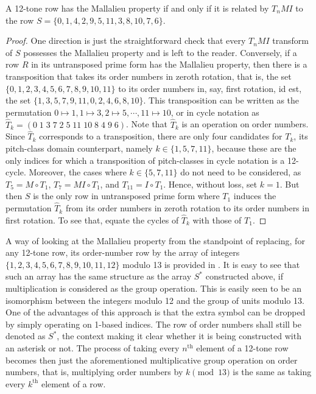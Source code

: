 \begin{proposition}
	\cite[17]{Morris1976}
	\label{morris-mallalieu}
	A 12-tone row has the Mallalieu property if and only if it is related by $T_nMI$ to the row $S = \{ 0, 1, 4, 2, 9, 5, 11, 3, 8, 10, 7, 6 \}$.
	\begin{proof}
		One direction is just the straightforward check that every $T_nMI$ transform of $S$ possesses the Mallalieu property and is left to the reader. Conversely, if a row $R$ in its untransposed prime form has the Mallalieu property, then there is a transposition that takes its order numbers in zeroth rotation, that is, the set $\{ 0, 1, 2, 3, 4, 5, 6, 7, 8, 9, 10, 11 \}$ to its order numbers in, say, first rotation, id est, the set $\{ 1, 3, 5, 7, 9, 11, 0, 2, 4, 6, 8, 10 \}$. This transposition can be written as the permutation $0 \mapsto 1, 1 \mapsto 3, 2 \mapsto 5, \cdots, 11 \mapsto 10 $, or in cycle notation as $\hat{T}_k = ( 0 \; 1 \; 3 \; 7 \; 2 \; 5 \; 11 \; 10 \; 8 \; 4 \; 9 \; 6 )$. Note that $\hat{T}_k$ is an operation on order numbers. Since $\hat{T}_k$ corresponds to a transposition, there are only four candidates for $T_k$, its pitch-class domain counterpart, namely $k \in \{ 1, 5, 7, 11 \}$, because these are the only indices for which a transposition of pitch-classes in cycle notation is a 12-cycle. Moreover, the cases where $k \in \{5, 7, 11\}$ do not need to be considered, as $T_5 = M \circ T_1$, $T_7 = M I \circ T_1$, and $T_{11} = I \circ T_1$. Hence, without loss, set $k = 1$. But then $S$ is the only row in untransposed prime form where $T_1$ induces the permutation $\hat{T}_k$ from its order numbers in zeroth rotation to its order numbers in first rotation. To see that, equate the cycles of $\hat{T}_k$ with those of $T_1$.
	\end{proof}
\end{proposition}

A way of looking at the Mallalieu property from the standpoint of replacing, for any 12-tone row, its order-number row by the array of integers $\{ 1, 2, 3, 4, 5, 6, 7, 8, 9, 10, 11, 12 \}$ modulo 13 is provided in \cite[278]{Lewin1966}. It is easy to see that such an array has the same structure as the array $S^*$ constructed above, if multiplication is considered as the group operation. This is easily seen to be an isomorphism between the integers modulo 12 and the group of units modulo 13. One of the advantages of this approach is that the extra symbol can be dropped by simply operating on 1-based indices. The row of order numbers shall still be denoted as $S^*$, the context making it clear whether it is being constructed with an asterisk or not. The process of taking every $n^\text{th}$ element of a 12-tone row becomes then just the aforementioned multiplicative group operation on order numbers, that is, multiplying order numbers by $k \pmod{13}$ is the same as taking every $k^\text{th}$ element of a row.

